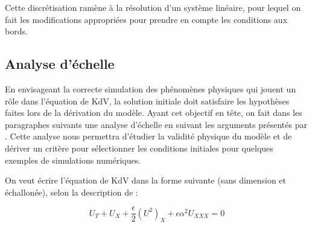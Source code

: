 \indent Cette discrétisation ramène à la résolution d'un système linéaire, pour lequel on fait les modifications appropriées pour prendre en compte les conditions aux bords.

%
%
%
%
%
%
%

\subsection{Analyse d'échelle}

\indent En envisageant la correcte simulation des phénomènes physiques qui jouent un rôle dans l'équation de KdV, la solution initiale doit satisfaire les hypothèses faites lors de la dérivation du modèle. Ayant cet objectif en tête, on fait dans les paragraphes suivants une analyse d'échelle en suivant les arguments présentés par \cite{BBM1971}. Cette analyse nous permettra d'étudier la validité physique du modèle et de dériver un critère pour sélectionner les conditions initiales pour quelques exemples de simulations numériques.

\indent On veut écrire l'équation de KdV dans la forme suivante (sans dimension et échallonée), selon la description de \cite{BBM1971} :

\begin{equation}
\label{eq:scaledKdV}
U_T + U_X + \frac{\epsilon}{2} (U^2)_X + \epsilon\alpha^2U_{XXX} = 0
\end{equation}


